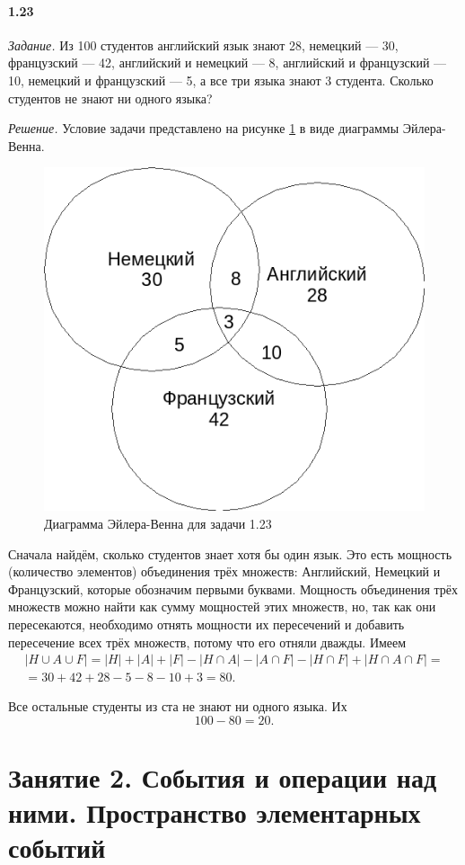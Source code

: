 \documentclass{book}
\begin{document}
\subsubsection*{1.23}

\textit{Задание.} Из 100 студентов английский язык знают 28,
немецкий --- 30, французский --- 42, английский и немецкий --- 8, английский и французский --- 10, немецкий и французский --- 5, а все три языка знают 3 студента.
Сколько студентов не знают ни одного языка?

\textit{Решение.} Условие задачи представлено на рисунке \ref{fig:123} в виде диаграммы Эйлера-Венна. 

\begin{figure}[h!]
  \centering
  \includegraphics[width=.4\textwidth]{./pictures/1_23.png}
  \caption{Диаграмма Эйлера-Венна для задачи 1.23}
  \label{fig:123}
\end{figure}

Сначала найдём, сколько студентов знает хотя бы один язык.
Это есть мощность (количество элементов) объединения трёх множеств: Английский, Немецкий и Французский, которые обозначим первыми буквами.
Мощность объединения трёх множеств можно найти как сумму мощностей этих множеств, но, так как они пересекаются,
необходимо отнять мощности их пересечений и добавить пересечение всех трёх множеств, потому что его отняли дважды.
Имеем
\begin{equation*}
\begin{split}
|H \cup A \cup F| =
|H| + |A| + |F| - |H \cap A| - |A \cap F| - |H \cap F| + |H \cap A \cap F| = \\
= 30 + 42 + 28 - 5 - 8 - 10 + 3 = 80.
\end{split}
\end{equation*}

Все остальные студенты из ста не знают ни одного языка.
Их 
$$ 100 - 80 = 20.$$

\chapter*{Занятие 2. События и операции над ними. Пространство элементарных событий}
\end{document}
